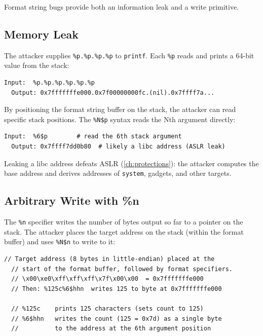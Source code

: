 Format string bugs provide both an information leak and a write primitive.

\subsection{Memory Leak}

The attacker supplies \texttt{\%p.\%p.\%p.\%p} to \texttt{printf}. Each \texttt{\%p} reads and prints a 64-bit value from the stack:

\begin{lstlisting}[caption=Leaking stack values]
  Input:  %p.%p.%p.%p.%p.%p
  Output: 0x7fffffffe000.0x7f00000000fc.(nil).0x7ffff7a... 
\end{lstlisting}

By positioning the format string buffer on the stack, the attacker can read specific stack positions. The \texttt{\%N\$p} syntax reads the Nth argument directly:

\begin{lstlisting}[caption=Direct parameter access]
  Input:  %6$p        # read the 6th stack argument
  Output: 0x7ffff7dd0b80  # likely a libc address (ASLR leak)
\end{lstlisting}

Leaking a libc address defeats ASLR (\ref{ch:protections}): the attacker computes the base address and derives addresses of \texttt{system}, gadgets, and other targets.

\subsection{Arbitrary Write with \%n}

The \texttt{\%n} specifier writes the number of bytes output so far to a pointer on the stack. The attacker places the target address on the stack (within the format buffer) and uses \texttt{\%N\$n} to write to it:

\begin{lstlisting}[caption=Writing to an arbitrary address]
  // Target address (8 bytes in little-endian) placed at the
  // start of the format buffer, followed by format specifiers.
  // \x00\xe0\xff\xff\xff\x7f\x00\x00  = 0x7fffffffe000
  // Then: %125c%6$hhn  writes 125 to byte at 0x7fffffffe000
	
  // %125c    prints 125 characters (sets count to 125)
  // %6$hhn   writes the count (125 = 0x7d) as a single byte
  //          to the address at the 6th argument position
\end{lstlisting}

